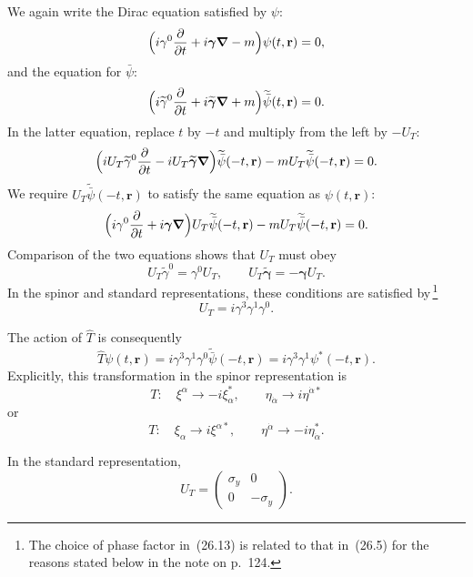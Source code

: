 We again write the Dirac equation satisfied by $\psi$:
\[
\Bigl(i\gamma^0\frac{\partial}{\partial t} + i\boldsymbol{\gamma}\boldsymbol{\nabla} - m\Bigr)\psi(t,\mathbf{r}) = 0,
\]
and the equation for $\bar\psi$:
\[
\Bigl(i\widetilde\gamma^0\frac{\partial}{\partial t} + i\widetilde{\boldsymbol{\gamma}}\boldsymbol{\nabla} + m\Bigr)\widetilde{\bar\psi}(t,\mathbf{r}) = 0.
\]
In the latter equation, replace $t$ by $-t$ and multiply from the left by $-U_T$:
\[
\Bigl(iU_T\widetilde\gamma^0\frac{\partial}{\partial t} - iU_T\widetilde{\boldsymbol{\gamma}}\boldsymbol{\nabla}\Bigr)\widetilde{\bar\psi}(-t,\mathbf{r}) - mU_T\widetilde{\bar\psi}(-t,\mathbf{r}) = 0.
\]
We require $U_T\widetilde{\bar\psi}(-t,\mathbf{r})$ to satisfy the same equation as $\psi(t,\mathbf{r})$:
\[
\Bigl(i\gamma^0\frac{\partial}{\partial t} + i\boldsymbol{\gamma}\boldsymbol{\nabla}\Bigr)U_T\widetilde{\bar\psi}(-t,\mathbf{r}) - mU_T\widetilde{\bar\psi}(-t,\mathbf{r}) = 0.
\]
Comparison of the two equations shows that $U_T$ must obey
\begin{equation}
U_T\widetilde\gamma^0 = \gamma^0 U_T,\qquad U_T\widetilde{\boldsymbol{\gamma}} = -\boldsymbol{\gamma}U_T.
\tag{26.12}
\end{equation}
In the spinor and standard representations, these conditions are satisfied by\,\footnote{The choice of phase factor in~(26.13) is related to that in~(26.5) for the reasons stated below in the note on p.~124.}
\begin{equation}
U_T = i\gamma^3\gamma^1\gamma^0.
\tag{26.13}
\end{equation}

The action of $\widehat T$ is consequently
\begin{equation}
\widehat T\psi(t,\mathbf{r}) = i\gamma^3\gamma^1\gamma^0\widetilde{\bar\psi}(-t,\mathbf{r}) = i\gamma^3\gamma^1\psi^*(-t,\mathbf{r}).
\tag{26.14}
\end{equation}
Explicitly, this transformation in the spinor representation is
\begin{equation}
T:\quad \xi^\alpha \to -i\xi^*_\alpha,\qquad \eta_{\dot\alpha} \to i\eta^{\dot\alpha*}
\tag{26.15a}
\end{equation}
or
\begin{equation}
T:\quad \xi_\alpha \to i\xi^{\alpha*},\qquad \eta^{\dot\alpha} \to -i\eta^*_{\dot\alpha}.
\tag{26.15b}
\end{equation}

In the standard representation,
\begin{equation}
U_T = \begin{pmatrix} \sigma_y & 0\\ 0 & -\sigma_y \end{pmatrix}.
\tag{26.16}
\end{equation}

